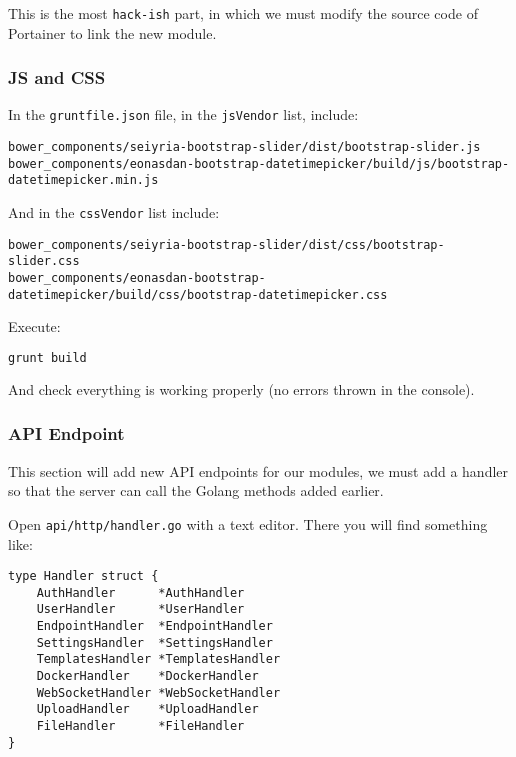 This is the most \texttt{hack-ish} part, in which we must modify the source code of Portainer to link the new module.

\subsubsection{JS and CSS}

In the \texttt{gruntfile.json} file, in the \texttt{jsVendor} list, include:

\begin{lstlisting}
bower_components/seiyria-bootstrap-slider/dist/bootstrap-slider.js
bower_components/eonasdan-bootstrap-datetimepicker/build/js/bootstrap-datetimepicker.min.js
\end{lstlisting}

And in the \texttt{cssVendor} list include:

\begin{lstlisting}
bower_components/seiyria-bootstrap-slider/dist/css/bootstrap-slider.css
bower_components/eonasdan-bootstrap-datetimepicker/build/css/bootstrap-datetimepicker.css
\end{lstlisting}

Execute:

\begin{lstlisting}[language=bash]
grunt build
\end{lstlisting}

And check everything is working properly (no errors thrown in the console).

\subsubsection{API Endpoint}

This section will add new API endpoints for our modules, we must add a handler so that the server can call the Golang methods added earlier.

Open \texttt{api/http/handler.go} with a text editor. There you will find something like:

\begin{lstlisting}[language=Golang]
type Handler struct {
    AuthHandler      *AuthHandler
    UserHandler      *UserHandler
    EndpointHandler  *EndpointHandler
    SettingsHandler  *SettingsHandler
    TemplatesHandler *TemplatesHandler
    DockerHandler    *DockerHandler
    WebSocketHandler *WebSocketHandler
    UploadHandler    *UploadHandler
    FileHandler      *FileHandler
}
\end{lstlisting}

